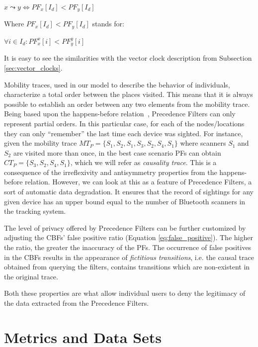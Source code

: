 \begin{center}
\begin{math}
	x\leadsto y \Longleftrightarrow PF_{x}[I_d] < PF_{y}[I_d]
\end{math}
\end{center}
Where $PF_x[I_d] < PF_y[I_d]$ stands for:
\begin{center}
  \begin{math}
    \forall i \in I_d : PF_x^x[i] < PF_y^y[i]
  \end{math}

\end{center}
It is easy to see the similarities with the vector clock description
from Subsection \ref{sec:vector_clocks}.

Mobility traces, used in our model to describe the behavior of
individuals, characterize a total order between the places
visited. This means that it is always possible to establish an order
between any two elements from the mobility trace. Being based upon the
happens-before relation~\cite{Lamport:1978}, Precedence Filters can
only represent partial orders. In this particular case, for each of
the nodes/locations they can only ``remember'' the last time each
device was sighted. For instance, given the mobility trace
$MT_{P}=\{S_1,S_2,S_1,S_3,S_2,S_4,S_1\}$ where scanners $S_1$ and $S_2$
are visited more than once, in the best case scenario PFs can obtain
$CT_{P}=\{S_3,S_2,S_4,S_1\}$, which we will refer as \emph{causality
 trace}. This is a consequence of the irreflexivity and antisymmetry
properties from the happens-before relation. However, we can look at
this as a feature of Precedence Filters, a sort of automatic data
degradation. It ensures that the record of sightings for any given
device has an upper bound equal to the number of Bluetooth scanners in
the tracking system.

The level of privacy offered by Precedence Filters can be further
customized by adjusting the CBFs' false positive ratio (Equation
\ref{eq:false_positive}). The higher the ratio, the greater the
inaccuracy of the PFs. The occurrence of false positives in the CBFs
results in the appearance of \emph{fictitious transitions}, i.e. the
causal trace obtained from querying the filters, contains transitions
which are non-existent in the original trace.

Both these properties are what allow individual users to deny the
legitimacy of the data extracted from the Precedence Filters.


\section{Metrics and Data Sets}
\label{sec:metrics-data-sets}

